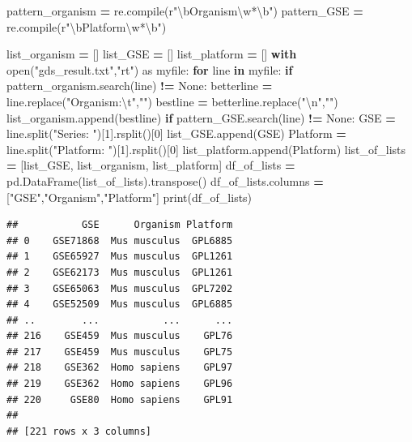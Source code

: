 \documentclass[
]{article}
\newenvironment{Shaded}{\begin{snugshade}}{\end{snugshade}}
\newcommand{\BuiltInTok}[1]{#1}
\newcommand{\CharTok}[1]{\textcolor[rgb]{0.31,0.60,0.02}{#1}}
\newcommand{\ControlFlowTok}[1]{\textcolor[rgb]{0.13,0.29,0.53}{\textbf{#1}}}
\newcommand{\DecValTok}[1]{\textcolor[rgb]{0.00,0.00,0.81}{#1}}
\newcommand{\ImportTok}[1]{#1}
\newcommand{\KeywordTok}[1]{\textcolor[rgb]{0.13,0.29,0.53}{\textbf{#1}}}
\newcommand{\NormalTok}[1]{#1}
\newcommand{\OperatorTok}[1]{\textcolor[rgb]{0.81,0.36,0.00}{\textbf{#1}}}
\newcommand{\StringTok}[1]{\textcolor[rgb]{0.31,0.60,0.02}{#1}}
\newcommand{\VariableTok}[1]{\textcolor[rgb]{0.00,0.00,0.00}{#1}}
\newcommand{\VerbatimStringTok}[1]{\textcolor[rgb]{0.31,0.60,0.02}{#1}}
\begin{document}
\begin{Shaded}
\begin{Highlighting}[]
\NormalTok{pattern_organism }\OperatorTok{=}\NormalTok{ re.}\BuiltInTok{compile}\NormalTok{(}\VerbatimStringTok{r"\textbackslash{}bOrganism\textbackslash{}w*\textbackslash{}b"}\NormalTok{)}
\NormalTok{pattern_GSE }\OperatorTok{=}\NormalTok{ re.}\BuiltInTok{compile}\NormalTok{(}\VerbatimStringTok{r"\textbackslash{}bPlatform\textbackslash{}w*\textbackslash{}b"}\NormalTok{)}

\NormalTok{list_organism }\OperatorTok{=}\NormalTok{ []}
\NormalTok{list_GSE }\OperatorTok{=}\NormalTok{ []}
\NormalTok{list_platform }\OperatorTok{=}\NormalTok{ []}
\ControlFlowTok{with} \BuiltInTok{open}\NormalTok{(}\StringTok{"gds_result.txt"}\NormalTok{,}\StringTok{"rt"}\NormalTok{) }\ImportTok{as}\NormalTok{ myfile:}
    \ControlFlowTok{for}\NormalTok{ line }\KeywordTok{in}\NormalTok{ myfile:}
        \ControlFlowTok{if}\NormalTok{ pattern_organism.search(line) }\OperatorTok{!=} \VariableTok{None}\NormalTok{:}
\NormalTok{            betterline }\OperatorTok{=}\NormalTok{ line.replace(}\StringTok{"Organism:}\CharTok{\textbackslash{}t}\StringTok{"}\NormalTok{,}\StringTok{""}\NormalTok{)}
\NormalTok{            bestline }\OperatorTok{=}\NormalTok{ betterline.replace(}\StringTok{"}\CharTok{\textbackslash{}n}\StringTok{"}\NormalTok{,}\StringTok{""}\NormalTok{)}
\NormalTok{            list_organism.append(bestline)}
        \ControlFlowTok{if}\NormalTok{ pattern_GSE.search(line) }\OperatorTok{!=} \VariableTok{None}\NormalTok{:}
\NormalTok{            GSE }\OperatorTok{=}\NormalTok{ line.split(}\StringTok{"Series: "}\NormalTok{)[}\DecValTok{1}\NormalTok{].rsplit()[}\DecValTok{0}\NormalTok{]}
\NormalTok{            list_GSE.append(GSE)}
\NormalTok{            Platform }\OperatorTok{=}\NormalTok{ line.split(}\StringTok{"Platform: "}\NormalTok{)[}\DecValTok{1}\NormalTok{].rsplit()[}\DecValTok{0}\NormalTok{]}
\NormalTok{            list_platform.append(Platform)}
\NormalTok{list_of_lists }\OperatorTok{=}\NormalTok{ [list_GSE, list_organism, list_platform]}
\NormalTok{df_of_lists }\OperatorTok{=}\NormalTok{ pd.DataFrame(list_of_lists).transpose()}
\NormalTok{df_of_lists.columns }\OperatorTok{=}\NormalTok{ [}\StringTok{"GSE"}\NormalTok{,}\StringTok{"Organism"}\NormalTok{,}\StringTok{"Platform"}\NormalTok{]}
\BuiltInTok{print}\NormalTok{(df_of_lists)}
\end{Highlighting}
\end{Shaded}

\begin{verbatim}
##           GSE      Organism Platform
## 0    GSE71868  Mus musculus  GPL6885
## 1    GSE65927  Mus musculus  GPL1261
## 2    GSE62173  Mus musculus  GPL1261
## 3    GSE65063  Mus musculus  GPL7202
## 4    GSE52509  Mus musculus  GPL6885
## ..        ...           ...      ...
## 216    GSE459  Mus musculus    GPL76
## 217    GSE459  Mus musculus    GPL75
## 218    GSE362  Homo sapiens    GPL97
## 219    GSE362  Homo sapiens    GPL96
## 220     GSE80  Homo sapiens    GPL91
## 
## [221 rows x 3 columns]
\end{verbatim}
\end{document}
